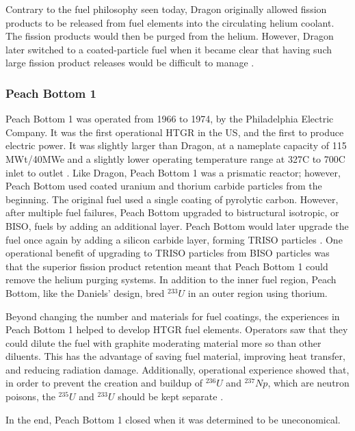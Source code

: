 Contrary to the fuel philosophy seen today, Dragon originally allowed fission products to be released from fuel elements into the circulating helium coolant.  The fission products would then be purged from the helium.  However, Dragon later switched to a coated-particle fuel when it became clear that having such large fission product releases would be difficult to manage \cite{simnad_early_1991}.

\subsubsection{Peach Bottom 1}

Peach Bottom 1 was operated from 1966 to 1974, by the Philadelphia Electric Company.  It was the first operational HTGR in the US, and the first to produce electric power.  It was slightly larger than Dragon, at a nameplate capacity of 115 MWt/40MWe and a slightly lower operating temperature range at 327\textdegree  C to 700\textdegree  C inlet to outlet \cite{beck_high_nodate}.  Like Dragon, Peach Bottom 1 was a prismatic reactor; however, Peach Bottom used coated uranium and thorium carbide particles from the beginning.  The original fuel used a single coating of pyrolytic carbon.  However, after multiple fuel failures, Peach Bottom upgraded to bistructural isotropic, or BISO, fuels by adding an additional layer.  Peach Bottom would later upgrade the fuel once again by adding a silicon carbide layer, forming TRISO particles \cite{beck_high_nodate}.  One operational benefit of upgrading to TRISO particles from BISO particles was that the superior fission product retention meant that Peach Bottom 1 could remove the helium purging systems.  In addition to the inner fuel region, Peach Bottom, like the Daniels' design, bred $^{233}U$ in an outer region using thorium.

Beyond changing the number and materials for fuel coatings, the experiences in Peach Bottom 1 helped to develop HTGR fuel elements.  Operators saw that they could dilute the fuel with graphite moderating material more so than other diluents.  This has the advantage of saving fuel material, improving heat transfer, and reducing radiation damage.  Additionally, operational experience showed that, in order to prevent the creation and buildup of $^{236}U$ and $^{237}Np$, which are neutron poisons, the $^{235}U$ and $^{233}U$ should be kept separate \cite{simnad_early_1991}.

In the end, Peach Bottom 1 closed when it was determined to be uneconomical.

